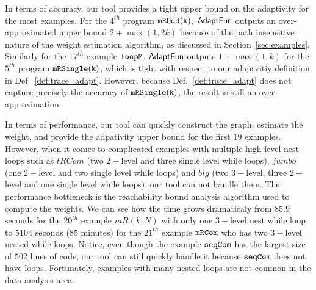 In terms of accuracy, our tool provides a tight
upper bound on the adaptivity for the most examples. 
 For the $4^{th}$ program $\mathtt{mROdd(k)}$, $\textsf{AdaptFun}$ outputs an over-approximated upper bound 
 $2 + \max(1, 2k)$ because of the path insensitive nature of the weight estimation algorithm, as discussed in Section~\ref{sec:examples}. 
 Similarly for the $17^{th}$ example $\mathtt{loopM}$. 
$\textsf{AdaptFun}$ outputs $1 + \max(1, k) $ for the $5^{th}$ program $\mathtt{mRSingle(k)}$, which is tight with respect to our adaptvitiy definition in Def.~\ref{def:trace_adapt}.
However, because Def.~\ref{def:trace_adapt} does not capture precisely the accuracy  of $\mathtt{mRSingle(k)}$,
the result is still an over-approximation.

In terms of performance, our tool can quickly construct the graph, estimate the weight,
and provide the adpativity upper bound for the first $19$ examples.
 However, when it comes to complicated examples with multiple high-level nest loops such as $tRCom$ (two $2-$level and three single level while loops), $jumbo$ (one $2-$level and two single level while loops) and $big$ (two $3-$level, three $2-$level and one single level while loops),
our tool can not handle them. The performance bottleneck is the reachability bound analysis algorithm used to compute the weights.
We can see how the time grows dramaticaly from $85.9$ seconds for the $20^{th}$ example $mR(k,N)$ with only one $3-$level nest while loop,
to $5104$ seconds ($85$ minutes) for the $21^{th}$ example $\mathtt{mRCom}$ who has two $3-$level nested while loops. 
Notice, even though the example $\mathtt{seqCom}$ has the largest size of $502$ lines 
of code, our tool can still quickly handle it because $\mathtt{seqCom}$ does not have loops. Fortunately, examples with many nested loops are not common in the data analysis area. 


